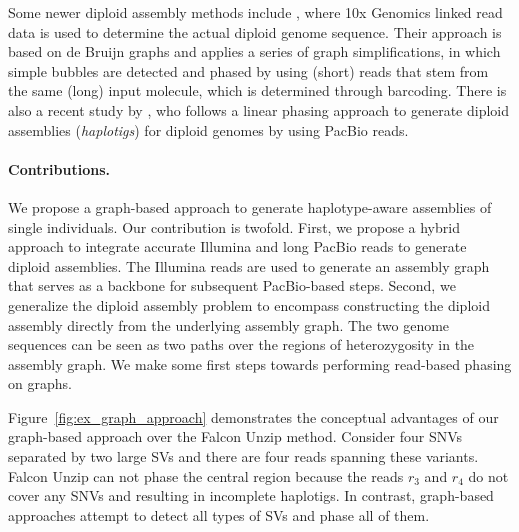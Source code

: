 Some newer diploid assembly methods include \cite{weisenfeld2017direct}, where 10x Genomics linked read data is used to determine the actual diploid genome sequence. 
Their approach is based on de Bruijn graphs and applies a series of graph simplifications, in which simple bubbles are detected and phased by using (short) reads that stem from the same (long) input molecule, which is determined through barcoding.
There is also a recent study by \cite{chin2016phased}, who follows a linear phasing approach to generate diploid assemblies (\textit{haplotigs}) for diploid genomes by using PacBio reads.

\paragraph{Contributions.}
We propose a graph-based approach to generate haplotype-aware assemblies of single individuals.
Our contribution is twofold. First, we propose a hybrid approach to integrate accurate Illumina and long PacBio reads to generate diploid assemblies. 
The Illumina reads are used to generate an assembly graph that serves as a backbone for subsequent PacBio-based steps.
Second, we generalize the diploid assembly problem to encompass constructing the diploid assembly directly from the underlying assembly graph.
The two genome sequences can be seen as two paths over the regions of heterozygosity in the assembly graph.
We make some first steps towards performing read-based phasing on graphs.

Figure~\ref{fig:ex_graph_approach} demonstrates the conceptual advantages of our graph-based approach over the Falcon Unzip method.
Consider four SNVs separated by two large SVs and there are four reads spanning these variants.
Falcon Unzip can not phase the central region because the reads $r_3$ and $r_4$ do not cover any SNVs and resulting in incomplete haplotigs.
In contrast, graph-based approaches attempt to detect all types of SVs and phase all of them.

